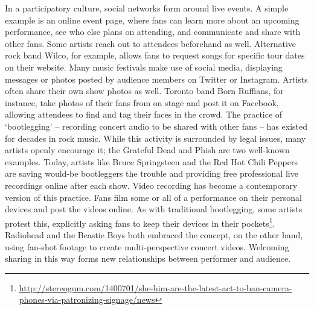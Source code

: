 In a participatory culture, social networks form around live events. A simple example is an online event page, where fans can learn more about an upcoming performance, see who else plans on attending, and communicate and share with other fans. Some artists reach out to attendees beforehand as well. Alternative rock band Wilco, for example, allows fans to request songs for specific tour dates on their website. Many music festivals make use of social media, displaying messages or photos posted by audience members on Twitter or Instagram. Artists often share their own show photos as well. Toronto band Born Ruffians, for instance, take photos of their fans from on stage and post it on Facebook, allowing attendees to find and tag their faces in the crowd. The practice of `bootlegging' -- recording concert audio to be shared with other fans -- has existed for decades in rock music. While this activity is surrounded by legal issues, many artists openly encourage it; the Grateful Dead and Phish are two well-known examples. Today, artists like Bruce Springsteen and the Red Hot Chili Peppers are saving would-be bootleggers the trouble and providing free professional live recordings online after each show. Video recording has become a contemporary version of this practice. Fans film some or all of a performance on their personal devices and post the videos online. As with traditional bootlegging, some artists protest this, explicitly asking fans to keep their devices in their pockets\footnote{\url{http://stereogum.com/1400701/she-him-are-the-latest-act-to-ban-camera-phones-via-patronizing-signage/news}}. Radiohead and the Beastie Boys both embraced the concept, on the other hand, using fan-shot footage to create multi-perspective concert videos. Welcoming sharing in this way forms new relationships between performer and audience.\\
